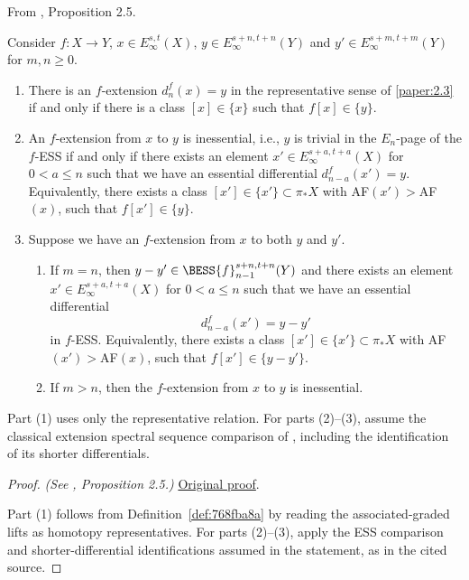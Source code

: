 \begin{proposition}
\label{paper:2.5}
From \cite{LWX126}, Proposition 2.5.\par

\label{prop:8154e6f1}
Consider $f: X\to Y$, $x\in E_\infty^{s,t}(X)$, $y\in E_\infty^{s+n,t+n}(Y)$ and $y'\in E_\infty^{s+m,t+m}(Y)$ for $m,n\ge 0$.
\begin{enumerate}
    \item There is an $f$-extension $d_n^{f}(x)=y$ in the representative sense of \ref{paper:2.3} if and only if there is a class $[x]\in \{x\}$ such that $f[x]\in \{y\}$.
    \item An $f$-extension from $x$ to $y$ is inessential, i.e., $y$ is trivial in the $E_n$-page of the $f$-ESS if and only if there exists an element $x'\in E_\infty^{s+a,t+a}(X)$ for $0<a\le n$ such that we have an essential differential $d_{n-a}^{f}(x')=y$. Equivalently, there exists a class $[x'] \in \{x'\} \subset \pi_*X$ with AF$(x')>$AF$(x)$, such that $f[x'] \in \{y\}$.

    \item Suppose we have an $f$-extension from $x$ to both $y$ and $y'$.
    \begin{enumerate}
        \item If $m=n$, then $y-y'\in \BESS{f}^{s+n,t+n}_{n-1}(Y)$ and there exists an element $x'\in E_\infty^{s+a,t+a}(X)$ for $0<a\le n$ such that we have an essential differential
        $$d_{n-a}^{f}(x') = y-y'$$
        in $f$-ESS. Equivalently, there exists a class $[x'] \in \{x'\} \subset \pi_*X$ with AF$(x')>$AF$(x)$, such that $f[x'] \in \{y-y'\}$.
        \item If $m>n$, then the $f$-extension from $x$ to $y$ is inessential.
     \end{enumerate}
\end{enumerate}



Part (1) uses only the representative relation. For parts (2)--(3),
assume the classical extension spectral sequence comparison of
\cite[Proposition 2.5]{LWX126}, including the identification of its
shorter differentials.


\sketch
\end{proposition}
\begin{proof}
\textit{(See \cite{LWX126}, Proposition 2.5.)} \href{paper/main.tex.html#L323}{Original proof}.

Part (1) follows from Definition~\ref{def:768fba8a} by reading the
associated-graded lifts as homotopy representatives. For parts (2)--(3), apply the ESS comparison and shorter-differential
identifications assumed in the statement, as in the cited source.
\end{proof}

